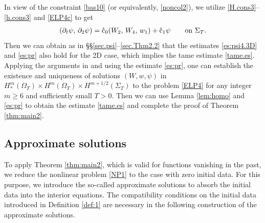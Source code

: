 \documentclass[twoside,11pt]{article}
\numberwithin{equation}{section}
\def\p{\partial}
\begin{document}
In view of the constraint \eqref{bas10} (or equivalently, \eqref{noncol2}), we  utilize \eqref{H.cons3}--\eqref{h.cons3} and \eqref{ELP4c} to get
\begin{align}
	(\p_t\psi,\, \p_2\psi)
	=\mathring{\rm c}_0 (W_2,\, W_4,\, w_1)
	+\mathring{\rm c}_1 \psi
	\qquad \textrm{on }\Sigma_T.
\end{align}
Then we can obtain as in \S\S \ref{sec.psi}--\ref{sec.Thm2.2} that the estimates \eqref{es:psi4.3D} and \eqref{es:pr} also hold for the 2D case, which implies the tame estimate \eqref{tame.es}.
Applying the arguments in \cite{CP82MR0678605, S95MMASMR1346663} and using the estimate \eqref{es:pr},
one can establish the existence and uniqueness of solutions $(W,w,\psi )$ in $H_*^m(\Omega_{T})\times H^m(\Omega_{T})\times H^{m+1/2}(\Sigma_{T})$ to the problem \eqref{ELP4} for any integer $m\geq 6$ and sufficiently small $T>0$.
Then we can use Lemma \ref{lem:homo}
and \eqref{es:pr} to obtain the estimate \eqref{tame.es} and complete the proof of Theorem \ref{thm:main2}.





\subsection{Approximate solutions}	
To apply Theorem \ref{thm:main2}, which is valid for functions vanishing in the past,
we reduce the nonlinear problem \eqref{NP1} to the case with zero initial data.
For this purpose, we introduce the so-called approximate solutions to absorb the initial data into the interior equations.
The compatibility conditions on the initial data introduced in Definition \ref{def:1} are necessary in the following construction of the approximate solutions.
\end{document}
